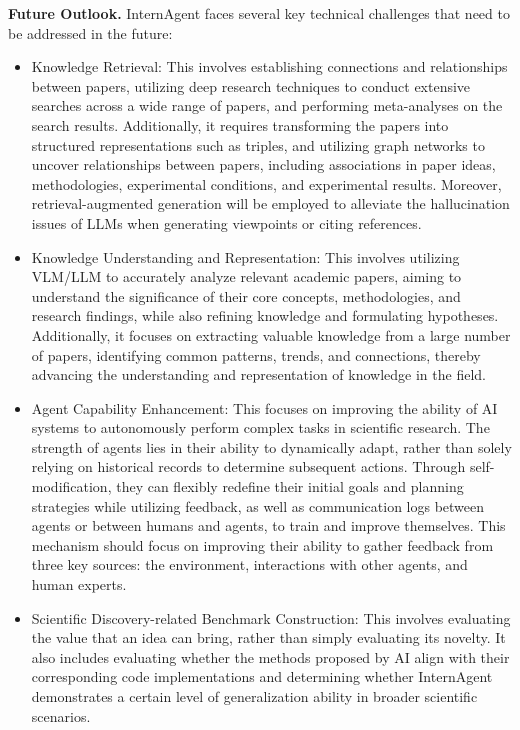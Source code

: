 \documentclass{article}
\begin{document}
\noindent \textbf{Future Outlook.} InternAgent faces several key technical challenges that need to be addressed in the future:
\begin{itemize}
    \item Knowledge Retrieval: This involves establishing connections and relationships between papers, utilizing deep research techniques to conduct extensive searches across a wide range of papers, and performing meta-analyses on the search results. Additionally, it requires transforming the papers into structured representations such as triples, and utilizing graph networks to uncover relationships between papers, including associations in paper ideas, methodologies, experimental conditions, and experimental results. Moreover, retrieval-augmented generation will be employed to alleviate the hallucination issues of LLMs when generating viewpoints or citing references.
    \item Knowledge Understanding and Representation: This involves utilizing VLM/LLM to accurately analyze relevant academic papers, aiming to understand the significance of their core concepts, methodologies, and research findings, while also refining knowledge and formulating hypotheses. Additionally, it focuses on extracting valuable knowledge from a large number of papers, identifying common patterns, trends, and connections, thereby advancing the understanding and representation of knowledge in the field.
    \item Agent Capability Enhancement: This focuses on improving the ability of AI systems to autonomously perform complex tasks in scientific research. The strength of agents lies in their ability to dynamically adapt, rather than solely relying on historical records to determine subsequent actions. Through self-modification, they can flexibly redefine their initial goals and planning strategies while utilizing feedback, as well as communication logs between agents or between humans and agents, to train and improve themselves. This mechanism should focus on improving their ability to gather feedback from three key sources: the environment, interactions with other agents, and human experts.
    \item Scientific Discovery-related Benchmark Construction: This involves evaluating the value that an idea can bring, rather than simply evaluating its novelty. It also includes evaluating whether the methods proposed by AI align with their corresponding code implementations and determining whether InternAgent demonstrates a certain level of generalization ability in broader scientific scenarios.

\end{itemize}
\end{document}
